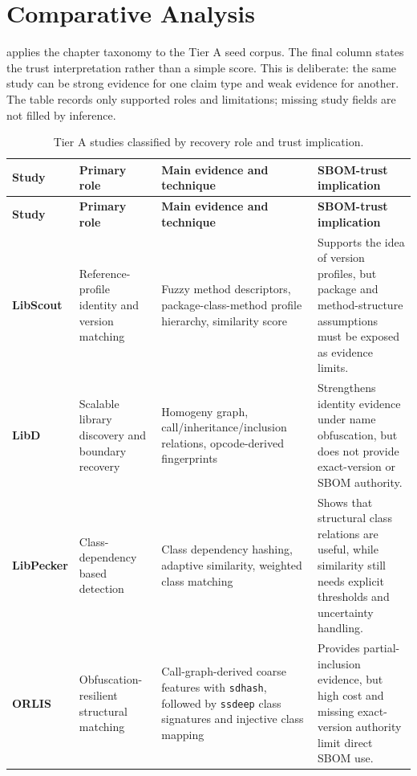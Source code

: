 \section{Comparative Analysis}

 applies the chapter taxonomy to the Tier
A seed corpus. The final column states the trust interpretation rather than a
simple score. This is deliberate: the same study can be strong evidence for
one claim type and weak evidence for another. The table records only supported
roles and limitations; missing study fields are not filled by inference.

\begingroup
\small
\renewcommand{\arraystretch}{1.15}
\begin{longtable}{p{}p{}p{}p{}}
\caption{Tier A studies classified by recovery role and trust implication.}
\label{tab:master-tier-a-comparison}\\
\toprule
\textbf{Study} & \textbf{Primary role} & \textbf{Main evidence and technique} & \textbf{SBOM-trust implication}\\
\midrule
\endfirsthead
\toprule
\textbf{Study} & \textbf{Primary role} & \textbf{Main evidence and technique} & \textbf{SBOM-trust implication}\\
\midrule
\endhead
\bottomrule
\endfoot
\textbf{LibScout} \cite{backes2016libscout} &
Reference-profile identity and version matching &
Fuzzy method descriptors, package-class-method profile hierarchy, similarity
score &
Supports the idea of version profiles, but package and method-structure
assumptions must be exposed as evidence limits.\\

\textbf{LibD} \cite{li2017libd} &
Scalable library discovery and boundary recovery &
Homogeny graph, call/inheritance/inclusion relations, opcode-derived
fingerprints &
Strengthens identity evidence under name obfuscation, but does not provide
exact-version or SBOM authority.\\

\textbf{LibPecker} \cite{zhang2018libpecker} &
Class-dependency based detection &
Class dependency hashing, adaptive similarity, weighted class matching &
Shows that structural class relations are useful, while similarity still
needs explicit thresholds and uncertainty handling.\\

\textbf{ORLIS} \cite{wang2018orlis} &
Obfuscation-resilient structural matching &
Call-graph-derived coarse features with \texttt{sdhash}, followed by
\texttt{ssdeep} class signatures and injective class mapping &
Provides partial-inclusion evidence, but high cost and missing exact-version
authority limit direct SBOM use.\\


\end{longtable}
